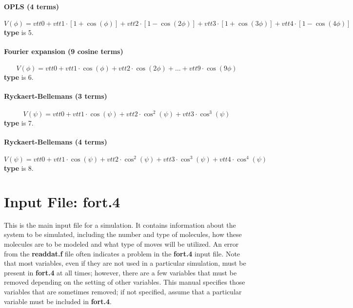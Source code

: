 \documentclass[12pt,letterpaper]{article}
\begin{document}
\paragraph{OPLS (4 terms)}
\begin{equation}
V(\phi) = vtt0 + vtt1\cdot[1+\cos(\phi)] + vtt2\cdot[1-\cos(2\phi)]
+ vtt3\cdot[1+\cos(3\phi)] + vtt4\cdot[1-\cos(4\phi)]
\end{equation}
{\bf type} is 5.

\paragraph{Fourier expansion (9 cosine terms)}
\begin{equation}
V(\phi) = vtt0 + vtt1\cdot\cos(\phi) + vtt2\cdot\cos(2\phi) + \dots
+ vtt9\cdot\cos(9\phi)
\end{equation}
{\bf type} is 6.

\paragraph{Ryckaert-Bellemans (3 terms)}
\begin{equation}
V(\psi) = vtt0 + vtt1\cdot\cos(\psi) + vtt2\cdot\cos^2(\psi) + vtt3\cdot\cos^3(\psi)
\end{equation}
{\bf type} is 7.

\paragraph{Ryckaert-Bellemans (4 terms)}
\begin{equation}
V(\psi) = vtt0 + vtt1\cdot\cos(\psi) + vtt2\cdot\cos^2(\psi) + vtt3\cdot\cos^3(\psi) + vtt4\cdot\cos^4(\psi)
\end{equation}
{\bf type} is 8.


\section{Input File: \textbf{fort.4}}
This is the main input file for a simulation. It contains
information about the system to be simulated, including the
number and type of molecules, how these molecules are to be
modeled and what type of moves will be utilized. An error
from the {\bf readdat.f} file often indicates a problem in
the {\bf fort.4} input file. Note that most variables, even
if they are not used in a particular simulation, must be
present in {\bf fort.4} at all times; however, there are a
few variables that must be removed depending on the setting
of other variables. This manual specifies those variables
that are sometimes removed; if not specified, assume that a
particular variable must be included in {\bf fort.4}.
\end{document}
